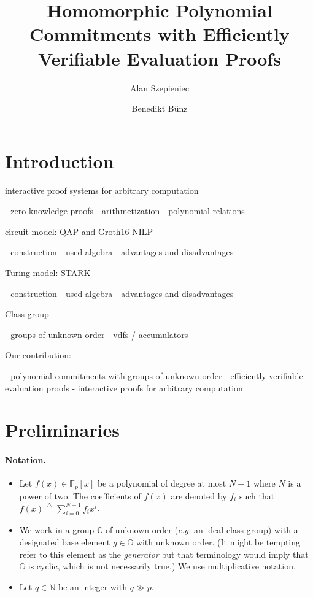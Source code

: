 \documentclass[10pt]{llncs}
\author{Alan Szepieniec\inst{1} \and Benedikt Bünz\inst{2}}
\institute{Nervos Foundation \\
\texttt{alan@nervos.org} \and Stanford University}
\title{Homomorphic Polynomial Commitments with Efficiently Verifiable Evaluation Proofs}
\begin{document}
\maketitle

\section{Introduction}

interactive proof systems for arbitrary computation

 - zero-knowledge proofs
 - arithmetization
 - polynomial relations
 
circuit model: QAP and Groth16 NILP

 - construction
 - used algebra
 - advantages and disadvantages
 
Turing model: STARK

 - construction
 - used algebra
 - advantages and disadvantages

Class group

 - groups of unknown order
 - vdfs / accumulators

Our contribution:

 - polynomial commitments with groups of unknown order
 - efficiently verifiable evaluation proofs
 - interactive proofs for arbitrary computation

\section{Preliminaries}

\paragraph{Notation.}
\begin{itemize}
\item Let $f(x) \in \mathbb{F}_p[x]$ be a polynomial of degree at most $N-1$ where $N$ is a power of two. The coefficients of $f(x)$ are denoted by $f_i$ such that $f(x) \stackrel{\triangle}{=} \sum_{i=0}^{N-1} f_i x^i$.
\item We work in a group $\mathbb{G}$ of unknown order (\emph{e.g.} an ideal class group) with a designated base element $g \in \mathbb{G}$ with unknown order. (It might be tempting refer to this element as the \emph{generator} but that terminology would imply that $\mathbb{G}$ is cyclic, which is not necessarily true.) We use multiplicative notation.
\item Let $q \in \mathbb{N}$ be an integer with $q \gg p$.
\end{itemize}
\end{document}
